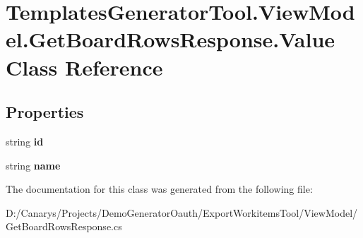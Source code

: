 \hypertarget{class_templates_generator_tool_1_1_view_model_1_1_get_board_rows_response_1_1_value}{}\section{Templates\+Generator\+Tool.\+View\+Model.\+Get\+Board\+Rows\+Response.\+Value Class Reference}
\label{class_templates_generator_tool_1_1_view_model_1_1_get_board_rows_response_1_1_value}
\subsection*{Properties}
\begin{DoxyCompactItemize}
\item 
\mbox{\label{class_templates_generator_tool_1_1_view_model_1_1_get_board_rows_response_1_1_value_a2ed17fdead943b7d99a4ba5181a4aa42}} 
string {\bfseries id}
\item 
\mbox{\label{class_templates_generator_tool_1_1_view_model_1_1_get_board_rows_response_1_1_value_aa8e3fa9bdc8f4fcf000972f904a78e3d}} 
string {\bfseries name}
\end{DoxyCompactItemize}


The documentation for this class was generated from the following file\+:\begin{DoxyCompactItemize}
\item 
D\+:/\+Canarys/\+Projects/\+Demo\+Generator\+Oauth/\+Export\+Workitems\+Tool/\+View\+Model/Get\+Board\+Rows\+Response.\+cs\end{DoxyCompactItemize}
